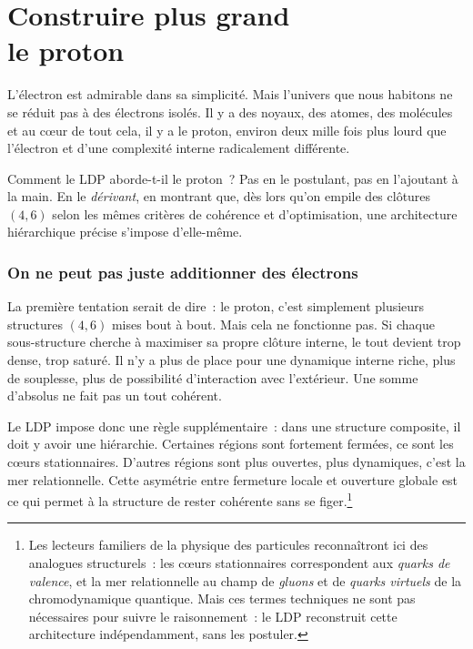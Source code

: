 \documentclass[12pt, a4paper, openright]{book}
\begin{document}
\chapter[Construire plus grand --- le proton]{Construire plus grand \\ le proton}

L'électron est admirable dans sa simplicité. Mais l'univers que nous habitons ne se réduit pas à des électrons isolés. Il y a des noyaux, des atomes, des molécules et au c\oe{}ur de tout cela, il y a le proton, environ deux mille fois plus lourd que l'électron et d'une complexité interne radicalement différente.

\medskip

Comment le LDP aborde-t-il le proton~? Pas en le postulant, pas en l'ajoutant à la main. En le \emph{dérivant}, en montrant que, dès lors qu'on empile des clôtures $(4,6)$ selon les mêmes critères de cohérence et d'optimisation, une architecture hiérarchique précise s'impose d'elle-même.

\subsection*{On ne peut pas juste additionner des électrons}

La première tentation serait de dire~: le proton, c'est simplement plusieurs structures $(4,6)$ mises bout à bout. Mais cela ne fonctionne pas. Si chaque sous-structure cherche à maximiser sa propre clôture interne, le tout devient trop dense, trop saturé. Il n'y a plus de place pour une dynamique interne riche, plus de souplesse, plus de possibilité d'interaction avec l'extérieur. Une somme d'absolus ne fait pas un tout cohérent.

\medskip

Le LDP impose donc une règle supplémentaire~: dans une structure composite, il doit y avoir une hiérarchie. Certaines régions sont fortement fermées, ce sont les c\oe{}urs stationnaires. D'autres régions sont plus ouvertes, plus dynamiques, c'est la mer relationnelle. Cette asymétrie entre fermeture locale et ouverture globale est ce qui permet à la structure de rester cohérente sans se figer.\footnote{Les lecteurs familiers de la physique des particules reconnaîtront ici des analogues structurels~: les c\oe{}urs stationnaires correspondent aux \emph{quarks de valence}, et la mer relationnelle au champ de \emph{gluons} et de \emph{quarks virtuels} de la chromodynamique quantique. Mais ces termes techniques ne sont pas nécessaires pour suivre le raisonnement~: le LDP reconstruit cette architecture indépendamment, sans les postuler.}
\end{document}
